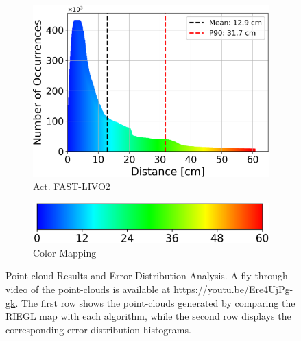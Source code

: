 \documentclass[a4paper, conference]{IEEEtran}
\begin{document}
\begin{figure}
\begin{subfigure}{0.19\textwidth}
    \centering
    \includegraphics[width=\textwidth]{pics/histogram_results/histogram_cond_actuated_livo.png}
    \caption{Act. FAST-LIVO2}
    \label{fig:hist_act_livo}
\end{subfigure}\vspace{2mm}
\begin{subfigure}{0.16\textwidth}
    \centering
    \includegraphics[width=\textwidth]{pics/histogram_results/hsv.png}
    \caption{Color Mapping}
    \label{fig:hsv}
\end{subfigure}
\caption{Point-cloud Results and Error Distribution Analysis. A fly through video of the point-clouds is available at \url{https://youtu.be/Ere4UjPg-gk}. 
The first row shows the point-clouds generated by comparing the RIEGL map with each algorithm, while the second row displays the corresponding error distribution histograms.}\vspace{-2mm}
\label{fig:combined_results}
\end{figure}
\end{document}
